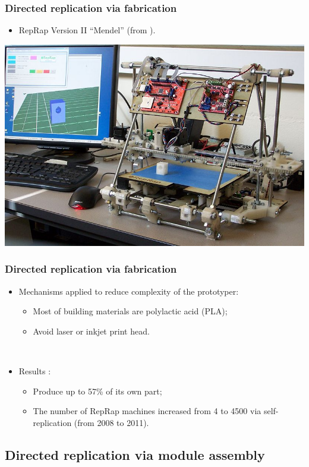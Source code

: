 \documentclass[14pt]{beamer}
\theoremstyle{remark}
\begin{document}
\begin{frame}
  \frametitle{Directed replication via fabrication}
  \begin{itemize}
  	\item RepRap Version II ``Mendel'' (from \cite{jones_reprap_2011}).
	\end{itemize}
	\begin{center}
	  \includegraphics[width=.7\textwidth]{mendel}
	\end{center}
\end{frame}

\begin{frame}
  \frametitle{Directed replication via fabrication}
  \begin{itemize}
  	\item Mechanisms applied to reduce complexity of the prototyper:
  	\begin{itemize}
  	  \item Most of building materials are polylactic acid (PLA);
  	  \item Avoid laser or inkjet print head.
  	\end{itemize}
  	
  	\mbox{ }
  	
  	\item Results :
  	\begin{itemize}
  	  \item Produce up to 57\% of its own part;
  	  \item The number of RepRap machines increased from 4 to 4500 via self-replication (from 2008 to 2011).
  	\end{itemize}
	\end{itemize}
\end{frame}

\subsection{Directed replication via module assembly}
\end{document}
